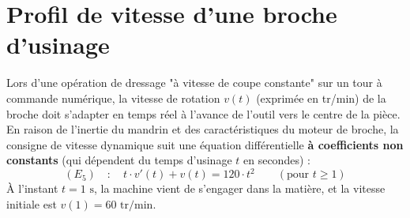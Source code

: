\documentclass[a4paper,11pt]{article}
\begin{document}
\section{Profil de vitesse d'une broche d'usinage}

Lors d'une opération de dressage "à vitesse de coupe constante" sur un tour à commande numérique, la vitesse de rotation $v(t)$ (exprimée en tr/min) de la broche doit s'adapter en temps réel à l'avance de l'outil vers le centre de la pièce. En raison de l'inertie du mandrin et des caractéristiques du moteur de broche, la consigne de vitesse dynamique suit une équation différentielle \textbf{à coefficients non constants} (qui dépendent du temps d'usinage $t$ en secondes) :
\[
(E_5) \quad : \quad t \cdot v'(t) + v(t) = 120 \cdot t^2 \qquad (\text{pour } t \geqslant 1)
\]
À l'instant $t = 1 \text{ s}$, la machine vient de s'engager dans la matière, et la vitesse initiale est $v(1) = 60 \text{ tr/min}$.
\end{document}

